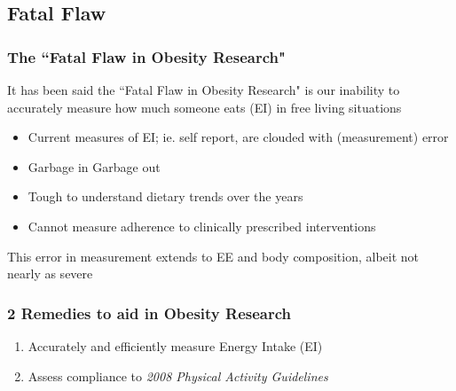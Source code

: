 \documentclass[handout]{beamer}\usepackage[]{graphicx}\usepackage[]{color}
\begin{document}



\subsection{Fatal Flaw}

\begin{frame}
\frametitle{The ``Fatal Flaw in Obesity Research"}
It has been said the ``Fatal Flaw in Obesity Research" is our inability to accurately measure how much someone eats (EI) in free living situations

\begin{itemize}
\item
Current measures of EI; ie. self report, are clouded with (measurement) error \\
\item
Garbage in Garbage out \\
\item
Tough to understand dietary trends over the years \\
\item
Cannot measure adherence to clinically prescribed interventions \\
\end{itemize}

This error in measurement extends to EE and body composition, albeit not nearly as severe

\end{frame}


\begin{frame}
\frametitle{2 Remedies to aid in Obesity Research}
\begin{enumerate}
\item
Accurately and efficiently measure Energy Intake (EI)

\vspace{0.2cm}

\item
Assess compliance to \emph{2008 Physical Activity Guidelines}
\end{enumerate}



\end{frame}

\subsection{}
\end{document}
